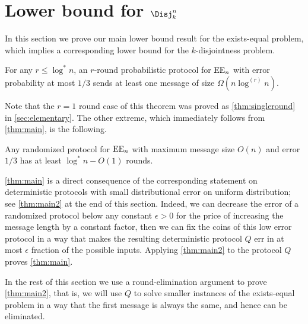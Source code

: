 \section{Lower bound for $\Disj^n_k$}
\label{sec:disj:lowerbound}



In this section we prove our main lower bound result for the 
exists-equal problem, which implies a corresponding lower bound
for the $k$-disjointness problem.
\begin{theorem}
\label{thm:main}
For any $r\leq\log^*n$, an $r$-round probabilistic protocol for
$\operatorname{EE}_n$ with error probability at most $1/3$ sends at least one
message of size $\Omega(n\log^{(r)}n)$.
\end{theorem}

Note that the $r=1$ round case of this theorem was proved as
\autoref{thm:singleround} in \autoref{sec:elementary}. The other
extreme, which immediately follows from \autoref{thm:main}, is
the following.

\begin{corollary}
Any randomized protocol for $\operatorname{EE}_n$ with maximum message size
$O(n)$ and error $1/3$ has at least $\log^* n - O(1)$ rounds.
\end{corollary}

\autoref{thm:main} is a direct consequence of the corresponding
statement on deterministic protocols with small distributional
error on uniform distribution; see \autoref{thm:main2} at the
end of this section. Indeed, we can decrease the error of a
randomized protocol below any constant $\epsilon>0$ for the
price of increasing the message length by a constant factor,
then we can fix the coins of this low error protocol in a way
that makes the resulting deterministic protocol $Q$ err in at
most $\epsilon$ fraction of the possible inputs. Applying
\autoref{thm:main2} to the protocol $Q$ proves
\autoref{thm:main}.

In the rest of this section we use a round-elimination argument
to prove \autoref{thm:main2}, that is, we will use $Q$ to solve
smaller instances of the exists-equal problem in a way that the
first message is always the same, and hence can be eliminated.

